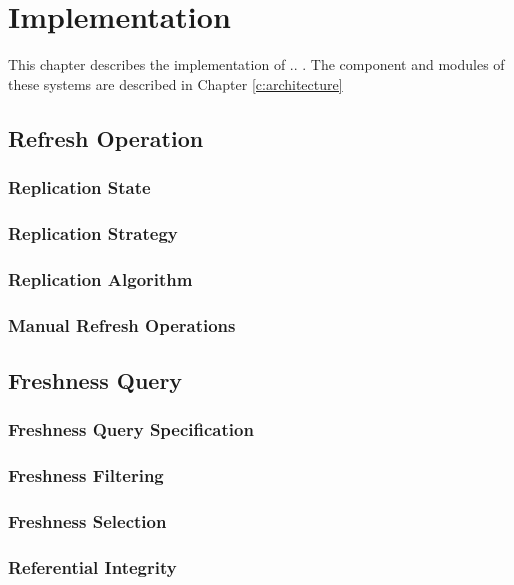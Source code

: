 \chapter{Implementation}
\label{c:implementation}

This chapter describes the implementation of .. . The component and modules of these systems are described in Chapter \ref{c:architecture}



\section{Refresh Operation}

\subsection{Replication State}
\subsection{Replication Strategy}


\subsection{Replication Algorithm}

\subsection{Manual Refresh Operations}

\section{Freshness Query}

\subsection{Freshness Query Specification}

\subsection{Freshness Filtering}

\subsection{Freshness Selection}

\subsection{Referential Integrity}
